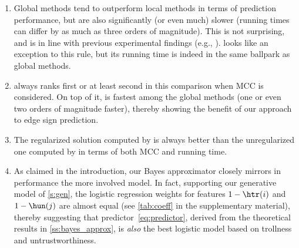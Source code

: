 \begin{enumerate}[leftmargin=2em,label=\textbf{\arabic*.}]

  \item Global methods tend to outperform local methods in terms of prediction performance, but are
    also significantly (or even much) slower (running times can differ by as much as three orders of
    magnitude). This is not surprising, and is in line with previous experimental findings (e.g.,
    \autocites{shahriari2014ranking}{wu2016troll}). \compbayesian{} looks like an exception to this
    rule, but its running time is indeed in the same ballpark as global methods.

  \item \uslpropGsec{} always ranks first or at least second in this comparison when MCC is
    considered. On top of it, \uslpropGsec{} is fastest among the global methods (one or even two
    orders of magnitude faster), thereby showing the benefit of our approach to edge sign
    prediction.

  \item The regularized solution computed by \uslpropGsec{} is always better than the unregularized
    one computed by \qoptim{} in terms of both MCC and running time.

  \item As claimed in the introduction, our Bayes approximator \usrule{} closely mirrors in
    performance the more involved \uslogregp{} model. In fact, supporting our generative model of
    \autoref{s:gen}, the logistic regression weights for features $1-\htr(i)$ and $1-\hun(j)$
    are almost equal (see \autoref{tab:coeff} in the supplementary material), thereby suggesting that
    predictor~\eqref{eq:predictor}, derived from the theoretical results in
    \autoref{ss:bayes_approx}, is \emph{also} the best logistic model based on trollness and
    untrustworthiness.
\end{enumerate}



